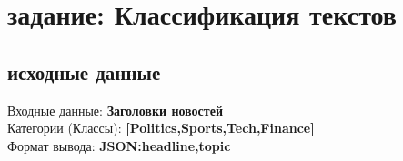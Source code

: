 \section{задание: Классификация текстов}
\subsection{исходные данные}
\indent Входные данные: \textbf{Заголовки новостей} \\
\indent Категории (Классы): \textbf{[Politics,Sports,Tech,Finance]} \\
\indent Формат вывода: \textbf{JSON:{headline,topic}} \\